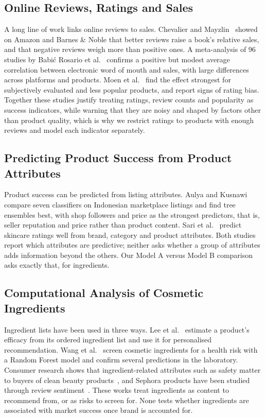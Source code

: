 \documentclass[11pt,a4paper]{article}
\newcommand{\draft}[1]{{\color{blue!70!black}#1}}
\begin{document}
\subsection{Online Reviews, Ratings and Sales}
\draft{A long line of work links online reviews to sales. Chevalier and Mayzlin~\cite{chevalier2006} showed on Amazon and Barnes \& Noble that better reviews raise a book's relative sales, and that negative reviews weigh more than positive ones. A meta-analysis of 96 studies by Babi\'{c} Rosario et al.~\cite{babic2016} confirms a positive but modest average correlation between electronic word of mouth and sales, with large differences across platforms and products. Moen et al.~\cite{moen2017} find the effect strongest for subjectively evaluated and less popular products, and report signs of rating bias. Together these studies justify treating ratings, review counts and popularity as success indicators, while warning that they are noisy and shaped by factors other than product quality, which is why we restrict ratings to products with enough reviews and model each indicator separately.}

\subsection{Predicting Product Success from Product Attributes}
\draft{Product success can be predicted from listing attributes. Aulya and Kusnawi~\cite{aulya2025} compare seven classifiers on Indonesian marketplace listings and find tree ensembles best, with shop followers and price as the strongest predictors, that is, seller reputation and price rather than product content. Sari et al.~\cite{sari2026} predict skincare ratings well from brand, category and product attributes. Both studies report which attributes are predictive; neither asks whether a group of attributes adds information beyond the others. Our Model A versus Model B comparison asks exactly that, for ingredients.}

\subsection{Computational Analysis of Cosmetic Ingredients}
\draft{Ingredient lists have been used in three ways. Lee et al.~\cite{lee2024} estimate a product's efficacy from its ordered ingredient list and use it for personalised recommendation. Wang et al.~\cite{wang2025} screen cosmetic ingredients for a health risk with a Random Forest model and confirm several predictions in the laboratory. Consumer research shows that ingredient-related attributes such as safety matter to buyers of clean beauty products~\cite{shim2024}, and Sephora products have been studied through review sentiment~\cite{rizqia2026}. These works treat ingredients as content to recommend from, or as risks to screen for. None tests whether ingredients are associated with market success once brand is accounted for.}
\end{document}
